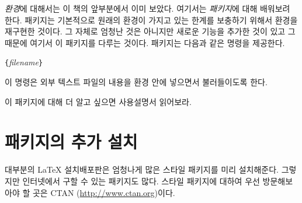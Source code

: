  \emph{환경}에 대해서는 이 책의 앞부분에서 이미 보았다.
여기서는  \emph{패키지}에 대해 배워보려 한다.
 패키지는 기본적으로 원래의  환경이 가지고 있는 한계를 보충하기 위해서  환경을 재구현한 것이다. 그 자체로 엄청난 것은 아니지만 새로운 기능을 추가한 것이 있고 그 때문에 여기서 이 패키지를 다루는 것이다.
 패키지는 다음과 같은 명령을 제공한다.
\begin{lscommand}
\verb|{|\emph{filename}\verb|}|
\end{lscommand}

\noindent 이 명령은 외부 텍스트 파일의 내용을  환경 안에 넣으면서 불러들이도록 한다.

이 패키지에 대해 더 알고 싶으면 사용설명서 \cite{verbatim}\를 읽어보라.

\section{패키지의 추가 설치}
\label{sec:Packages}

대부분의 \LaTeX{} 설치배포판은 엄청나게 많은 스타일 패키지를 미리 설치해준다. 
그렇지만 인터넷에서 구할 수 있는 패키지도 많다. 스타일 패키지에 대하여 우선 방문해보아야 할 곳은 CTAN (\url{http://www.ctan.org})이다.

